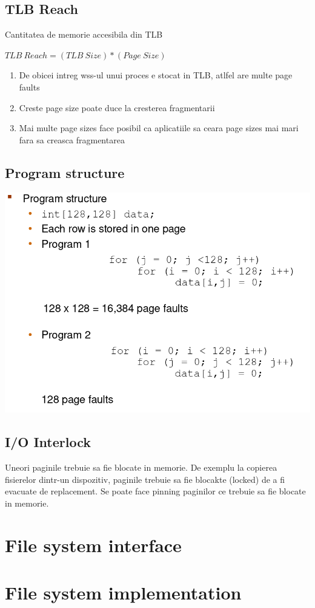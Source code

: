 \documentclass{article}
\begin{document}
\subsection*{TLB Reach}
Cantitatea de memorie accesibila din TLB
\begin{center}
    \begin{math}
TLB\ Reach = (TLB\ Size) * (Page\ Size)
    \end{math}
\end{center}
\begin{enumerate}
    \item De obicei intreg wss-ul unui proces e stocat in TLB, atlfel are multe page faults
    \item Creste page size poate duce la cresterea fragmentarii
    \item Mai multe page sizes face posibil ca aplicatiile sa ceara page sizes mai mari fara sa creasca fragmentarea
\end{enumerate}

\subsection*{Program structure}
\begin{center}
    \includegraphics[scale=0.4]{40-progstruct.png}
\end{center}

\subsection*{I/O Interlock}
Uneori paginile trebuie sa fie blocate in memorie. De exemplu la copierea fisierelor dintr-un dispozitiv, paginile trebuie sa fie blocakte (locked) de a fi evacuate de replacement. Se poate face pinning paginilor ce trebuie sa fie blocate in memorie.

\section[Ch13 File system interface]{File system interface}
\section[Ch14 File system implementation]{File system implementation}
\end{document}
